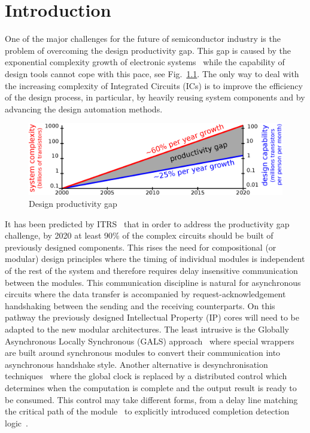 \chapter{Introduction}

One of the major challenges for the future of semiconductor industry is the problem of overcoming the design productivity gap. This gap is caused by the exponential complexity growth of electronic systems~\cite{Moore_1965_e}  while the capability of design tools cannot cope with this pace, see Fig.~\ref{fig:productivity_gap}. The only way to deal with the increasing complexity of Integrated Circuits (ICs) is to improve the efficiency of the design process, in particular, by heavily reusing system components and by advancing the design automation methods.

\begin{figure}
\centering
   \includegraphics[scale=0.5]{fig/figs/productivity_gap}
   \caption{
     \label{fig:productivity_gap}
     Design productivity gap}
\end{figure}


It has been predicted by ITRS~\cite{ITRS_2011} that in order to address the productivity gap challenge, by 2020 at least 90\% of the complex circuits should be built of previously designed components. This rises the need for compositional (or modular) design principles where the timing of individual modules is independent of the rest of the system and  therefore requires delay insensitive communication between the modules. This communication discipline is natural for asynchronous circuits where the data transfer is accompanied by request-acknowledgement handshaking between the sending and the receiving counterparts. On this pathway the previously designed Intellectual Property (IP) cores will need to be adapted to the new modular architectures. The least intrusive is the Globally Asynchronous Locally Synchronous (GALS) approach~\cite{Chapiro_1984_phd} where special wrappers~\cite{Mullins_2007_async, Fan_2009_iccd} are built around synchronous modules to convert their communication into asynchronous handshake style. Another alternative is desynchronisation techniques~\cite{Cortadella_2006_ieeetcad} where the global clock is replaced by a distributed control which determines when the computation is complete and the output result is ready to be consumed. This control may take different forms, from a delay line matching the critical path of the module~\cite{Cortadella_2010_icicdt} to explicitly introduced completion detection logic~\cite{Kondratyev_2002_ieeedtc}.

